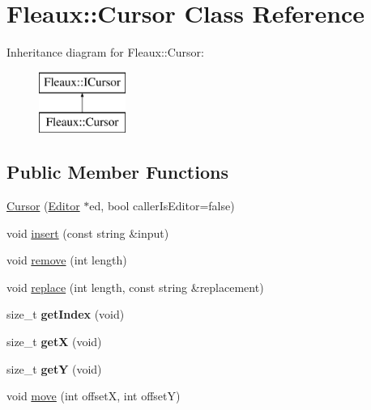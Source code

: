 \hypertarget{classFleaux_1_1Cursor}{}\section{Fleaux\+:\+:Cursor Class Reference}
\label{classFleaux_1_1Cursor}
Inheritance diagram for Fleaux\+:\+:Cursor\+:\begin{figure}[H]
\begin{center}
\leavevmode
\includegraphics[height=2.000000cm]{classFleaux_1_1Cursor}
\end{center}
\end{figure}
\subsection*{Public Member Functions}
\begin{DoxyCompactItemize}
\item 
\hyperlink{classFleaux_1_1Cursor_a4dcda4244b32b97d7251a64719a348b7}{Cursor} (\hyperlink{classFleaux_1_1Editor}{Editor} $\ast$ed, bool caller\+Is\+Editor=false)
\item 
void \hyperlink{classFleaux_1_1Cursor_a99c820ad3d952b5e38a41a11c18e7c2f}{insert} (const string \&input)
\item 
void \hyperlink{classFleaux_1_1Cursor_a0fca52d6d4e589f8eef50a351e8340ff}{remove} (int length)
\item 
void \hyperlink{classFleaux_1_1Cursor_a439606f718dd885f4f96ca3244c3172a}{replace} (int length, const string \&replacement)
\item 
\hypertarget{classFleaux_1_1Cursor_ab74cdfed4d67434dab2b754de3ac875b}{}size\+\_\+t {\bfseries get\+Index} (void)\label{classFleaux_1_1Cursor_ab74cdfed4d67434dab2b754de3ac875b}

\item 
\hypertarget{classFleaux_1_1Cursor_a22527c0a0b5a1a2ca55b9cdbde15d2a1}{}size\+\_\+t {\bfseries get\+X} (void)\label{classFleaux_1_1Cursor_a22527c0a0b5a1a2ca55b9cdbde15d2a1}

\item 
\hypertarget{classFleaux_1_1Cursor_a676f4b83754926e416883564ffdfd4ca}{}size\+\_\+t {\bfseries get\+Y} (void)\label{classFleaux_1_1Cursor_a676f4b83754926e416883564ffdfd4ca}

\item 
void \hyperlink{classFleaux_1_1Cursor_a91e3ff97154764836099fdb13002c877}{move} (int offset\+X, int offset\+Y)
\end{DoxyCompactItemize}
